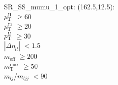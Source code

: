 SR\_SS\_mumu\_1\_opt: (162.5,12.5): \\
$p_{\text{T}}^{l1}$ $\geq 60$ \\
$p_{\text{T}}^{l2}$ $\geq 20$ \\
$p_{\text{T}}^{ll}$ $\geq 30$ \\
$|\Delta\eta_{ll}|$ $<1.5$ \\
$m_{\text{eff}}$ $\geq 200$ \\
$m_{\text{T}}^{\text{max}}$ $\geq 50$ \\
$m_{lj}$/$m_{ljj}$ $<90$ \\
